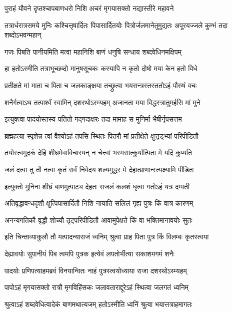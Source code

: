 \twolineshloka
{पुराहं यौवने दृप्तश्चापबाणधरो निशि}
{अचरं मृगयासक्तो नद्यास्तीरे महावने} %

\threelineshloka
{तत्रार्धरात्रसमये मुनिः कश्चित्तृषार्दितः}
{पिपासार्दितयोः पित्रोर्जलमानेतुमुद्यतः}
{अपूरयज्जले कुम्भं तदा शब्दोऽभवन्महान्} %

\twolineshloka
{गजः पिबति पानीयमिति मत्वा महानिशि}
{बाणं धनुषि सन्धाय शब्दवेधिनमक्षिपम्} %

\twolineshloka
{हा हतोऽस्मीति तत्राभूच्छब्दो मानुषसूचकः}
{कस्यापि न कृतो दोषो मया केन हतो विधे} %

\twolineshloka
{प्रतीक्षते मां माता च पिता च जलकाङ्क्षया}
{तच्छ्रुत्वा भयसन्त्रस्तस्ततोऽहं पौरुषं वचः} %

\twolineshloka
{शनैर्गत्वाऽथ तत्पार्श्वं स्वामिन् दशरथोऽस्म्यहम्}
{अजानता मया विद्धस्त्रातुमर्हसि मां मुने} %

\twolineshloka
{इत्युक्त्वा पादयोस्तस्य पतितो गद्गदाक्षरः}
{तदा मामाह स मुनिर्मा भैषीर्नृपसत्तम} %

\twolineshloka
{ब्रह्महत्या स्पृशेन्न त्वां वैश्योऽहं तपसि स्थितः}
{पितरौ मां प्रतीक्षेते क्षुत्तृड्भ्यां परिपीडितौ} %

\twolineshloka
{तयोस्त्वमुदकं देहि शीघ्रमेवाविचारयन्}
{न चेत्त्वां भस्मसात्कुर्यात्पिता मे यदि कुप्यति} %

\twolineshloka
{जलं दत्वा तु तौ नत्वा कृतं सर्वं निवेदय}
{शल्यमुद्धर मे देहात्प्राणान्स्त्यक्ष्यामि पीडितः} %

\twolineshloka
{इत्युक्तो मुनिना शीघ्रं बाणमुत्पाट्य देहतः}
{सजलं कलशं धृत्वा गतोऽहं यत्र दम्पती} %

\twolineshloka
{अतिवृद्धावन्धदृशौ क्षुत्पिपासार्दितौ निशि}
{नायाति सलिलं गृह्य पुत्रः किं वात्र कारणम्} %

\twolineshloka
{अनन्यगतिकौ वृद्धौ शोच्यौ तृट्परिपीडितौ}
{आवामुपेक्षते किं वा भक्तिमानावयोः सुतः} %

\twolineshloka
{इति चिन्ताव्याकुलौ तौ मत्पादन्यासजं ध्वनिम्}
{श्रुत्वा प्राह पिता पुत्र किं विलम्बः कृतस्त्वया} %

\twolineshloka
{देह्यावयोः सुपानीयं पिब त्वमपि पुत्रक}
{इत्येवं लपतोर्भीत्या सकाशमगमं शनैः} %

\twolineshloka
{पादयोः प्रणिपत्याहमब्रवं विनयान्वितः}
{नाहं पुत्रस्त्वयोध्याया राजा दशरथोऽस्म्यहम्} %

\twolineshloka
{पापोऽहं मृगयासक्तो रात्रौ मृगविहिंसकः}
{जलावताराद्दूरेऽहं स्थित्वा जलगतं ध्वनिम्} %

\twolineshloka
{श्रुत्वाऽहं शब्दवेधित्वादेकं बाणमथात्यजम्}
{हतोऽस्मीति ध्वनिं श्रुत्वा भयात्तत्राहमागतः} %

